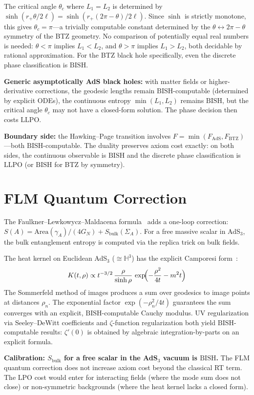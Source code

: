 \documentclass[11pt,a4paper]{report}
\theoremstyle{plain}
\theoremstyle{definition}
\theoremstyle{remark}
\newcommand{\BISH}{\mathrm{BISH}}
\newcommand{\LLPO}{\mathrm{LLPO}}
\newcommand{\LPO}{\mathrm{LPO}}
\begin{document}
The critical angle $\theta_c$ where $L_1 = L_2$ is determined by $\sinh(r_+\theta/2\ell) = \sinh(r_+(2\pi-\theta)/2\ell)$. Since $\sinh$ is strictly monotone, this gives $\theta_c = \pi$---a trivially computable constant determined by the $\theta \leftrightarrow 2\pi - \theta$ symmetry of the BTZ geometry. No comparison of potentially equal real numbers is needed: $\theta < \pi$ implies $L_1 < L_2$, and $\theta > \pi$ implies $L_1 > L_2$, both decidable by rational approximation. For the BTZ black hole specifically, even the discrete phase classification is $\BISH$.

\textbf{Generic asymptotically AdS black holes:} with matter fields or higher-derivative corrections, the geodesic lengths remain $\BISH$-computable (determined by explicit ODEs), the continuous entropy $\min(L_1,L_2)$ remains $\BISH$, but the critical angle $\theta_c$ may not have a closed-form solution. The phase decision then costs $\LLPO$.

\textbf{Boundary side:} the Hawking--Page transition involves $F = \min(F_{\mathrm{AdS}},F_{\mathrm{BTZ}})$---both $\BISH$-computable. The duality preserves axiom cost exactly: on both sides, the continuous observable is $\BISH$ and the discrete phase classification is $\LLPO$ (or $\BISH$ for BTZ by symmetry).

\section{FLM Quantum Correction}

The Faulkner--Lewkowycz--Maldacena formula~\cite{FLM2013} adds a one-loop correction: $S(A) = \mathrm{Area}(\gamma_A)/(4G_N) + S_{\mathrm{bulk}}(\Sigma_A)$. For a free massive scalar in AdS$_3$, the bulk entanglement entropy is computed via the replica trick on bulk fields.

The heat kernel on Euclidean AdS$_3$ ($\cong \mathbb{H}^3$) has the explicit Camporesi form~\cite{Camporesi1990}:
\[
  K(t,\rho) \propto t^{-3/2}\,\frac{\rho}{\sinh\rho}\,\exp\!\Bigl(-\frac{\rho^2}{4t} - m^2 t\Bigr)
\]
The Sommerfeld method of images produces a sum over geodesics to image points at distances $\rho_n$. The exponential factor $\exp(-\rho_n^2/4t)$ guarantees the sum converges with an explicit, $\BISH$-computable Cauchy modulus. UV regularization via Seeley--DeWitt coefficients and $\zeta$-function regularization both yield $\BISH$-computable results: $\zeta'(0)$ is obtained by algebraic integration-by-parts on an explicit formula.

\textbf{Calibration: $S_{\mathrm{bulk}}$ for a free scalar in the AdS$_3$ vacuum is $\BISH$.} The FLM quantum correction does not increase axiom cost beyond the classical RT term. The $\LPO$ cost would enter for interacting fields (where the mode sum does not close) or non-symmetric backgrounds (where the heat kernel lacks a closed form).
\end{document}

